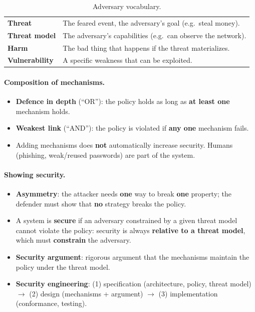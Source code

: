 \begin{table}[h]
\centering
\begin{tabular}{@{}p{3cm}p{10.5cm}@{}}
\toprule
\textbf{Threat} & The feared event, the adversary's goal (e.g.\ steal money). \\
\textbf{Threat model} & The adversary's capabilities (e.g.\ can observe the network). \\
\textbf{Harm} & The bad thing that happens if the threat materializes. \\
\textbf{Vulnerability} & A specific weakness that can be exploited. \\
\bottomrule
\end{tabular}
\caption{Adversary vocabulary.}
\end{table}

\paragraph{Composition of mechanisms.}
\begin{itemize}
    \item \textbf{Defence in depth} (``OR''): the policy holds as long as \textbf{at least one} mechanism holds.
    \item \textbf{Weakest link} (``AND''): the policy is violated if \textbf{any one} mechanism fails.
    \item Adding mechanisms does \textbf{not} automatically increase security. Humans (phishing, weak/reused passwords) are part of the system.
\end{itemize}

\paragraph{Showing security.}
\begin{itemize}
    \item \textbf{Asymmetry}: the attacker needs \textbf{one} way to break \textbf{one} property; the defender must show that \textbf{no} strategy breaks the policy.
    \item A system is \textbf{secure} if an adversary constrained by a given threat model cannot violate the policy: security is always \textbf{relative to a threat model}, which must \textbf{constrain} the adversary.
    \item \textbf{Security argument}: rigorous argument that the mechanisms maintain the policy under the threat model.
    \item \textbf{Security engineering}: (1) specification (architecture, policy, threat model) $\to$ (2) design (mechanisms + argument) $\to$ (3) implementation (conformance, testing).
\end{itemize}

